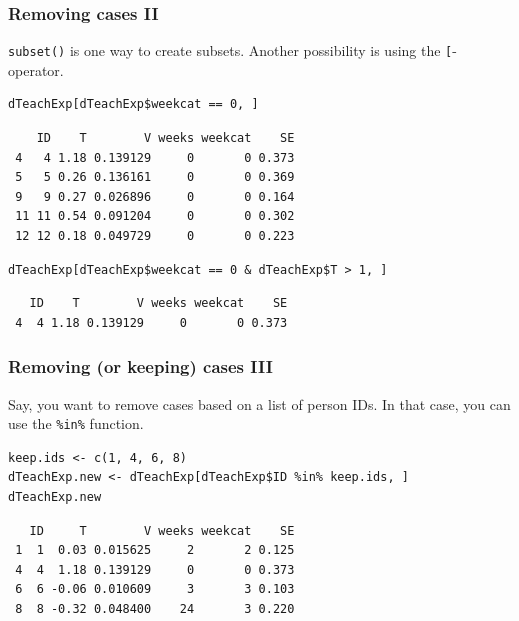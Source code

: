 \documentclass[bigger]{beamer}
\begin{document}
\begin{frame}[fragile]
\frametitle{Removing cases II}
\label{sec-4-1-4}

    \texttt{subset()} is one way to create subsets. Another possibility is using the
    \texttt{[}-operator. 

\lstset{language=R}
\begin{lstlisting}
dTeachExp[dTeachExp$weekcat == 0, ]
\end{lstlisting}

\begin{verbatim}
    ID    T        V weeks weekcat    SE
 4   4 1.18 0.139129     0       0 0.373
 5   5 0.26 0.136161     0       0 0.369
 9   9 0.27 0.026896     0       0 0.164
 11 11 0.54 0.091204     0       0 0.302
 12 12 0.18 0.049729     0       0 0.223
\end{verbatim}



\lstset{language=R}
\begin{lstlisting}
dTeachExp[dTeachExp$weekcat == 0 & dTeachExp$T > 1, ]
\end{lstlisting}

\begin{verbatim}
   ID    T        V weeks weekcat    SE
 4  4 1.18 0.139129     0       0 0.373
\end{verbatim}
\end{frame}
\begin{frame}[fragile,shrink=0]
\frametitle{Removing (or keeping) cases III}
\label{sec-4-1-5}

    Say, you want to remove cases based on a list of person IDs. In that case, you can use the \texttt{\%in\%} function.

\lstset{language=R}
\begin{lstlisting}
keep.ids <- c(1, 4, 6, 8)
dTeachExp.new <- dTeachExp[dTeachExp$ID %in% keep.ids, ]
dTeachExp.new
\end{lstlisting}

\begin{verbatim}
   ID     T        V weeks weekcat    SE
 1  1  0.03 0.015625     2       2 0.125
 4  4  1.18 0.139129     0       0 0.373
 6  6 -0.06 0.010609     3       3 0.103
 8  8 -0.32 0.048400    24       3 0.220
\end{verbatim}

    
    
    
\end{frame}
\end{document}
